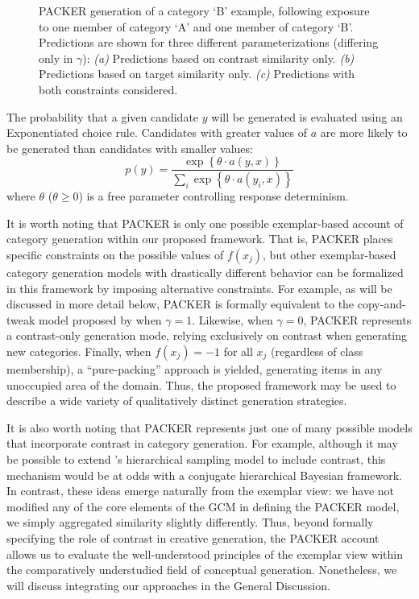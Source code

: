 \documentclass[12pt]{article}
\newcommand\inputpgf[2]{{
\let\pgfimageWithoutPath\pgfimage
\renewcommand{\pgfimage}[2][]{\pgfimageWithoutPath[##1]{#1/##2}}

}}
\begin{document}
\begin{flushleft}
\begin{figure}
	\begin{center}
		\inputpgf{figs/}{packer-examples.pgf}
		\caption{PACKER generation of a category `B' example, following exposure to one member of category `A' and one member of category `B'. Predictions are shown for three different parameterizations (differing only in $\gamma$): \textit{(a)} Predictions based on contrast similarity only. \textit{(b)} Predictions based on target similarity only.  \textit{(c)} Predictions with both constraints considered.}
		\label{fig:packer-examples}
	\end{center}
\end{figure}

The probability that a given candidate $y$ will be generated is evaluated using an Exponentiated \citet{luce1977choice} choice rule. Candidates with greater values of $a$ are more likely to be generated than candidates with smaller values:
% 
\begin{equation}
p(y) = \dfrac
{ \exp  \left \{ \theta \cdot a \left( y, x \right) \right \} } 
{ \sum_i{ \exp  \left \{ \theta \cdot a \left( y_i, x \right) \right\}  } }
\label{eq:packer-choice}
\end{equation}
% 
where $\theta$ ($\theta \geq 0$) is a free parameter controlling response determinism. 

It is worth noting that PACKER is only one possible exemplar-based account of category generation within our proposed framework. That is, PACKER places specific constraints on the possible values of $f(x_j)$, but other exemplar-based category generation models with drastically different behavior can be formalized in this framework by imposing alternative constraints. For example, as will be discussed in more detail below, PACKER is formally equivalent to the copy-and-tweak model proposed by \cite{jern2013probabilistic} when $\gamma = 1$. Likewise, when $\gamma = 0$, PACKER represents a contrast-only generation mode, relying exclusively on contrast when generating new categories. Finally, when $f(x_j) = -1$ for all $x_j$ (regardless of class membership), a ``pure-packing'' approach is yielded, generating items in any unoccupied area of the domain. Thus, the proposed framework may be used to describe a wide variety of qualitatively distinct generation strategies.


It is also worth noting that PACKER represents just one of many possible models that incorporate contrast in category generation. For example, although it may be possible to extend \cite{jern2013probabilistic}'s hierarchical sampling model to include contrast, this mechanism would be at odds with a conjugate hierarchical Bayesian framework. In contrast, these ideas emerge naturally from the exemplar view: we have not modified any of the core elements of the GCM in defining the PACKER model, we simply aggregated similarity slightly differently. Thus, beyond formally specifying the role of contrast in creative generation, the PACKER account allows us to evaluate the well-understood principles of the exemplar view within the comparatively understudied field of conceptual generation. Nonetheless, we will discuss integrating our approaches in the General Discussion.


\end{flushleft}
\end{document}
